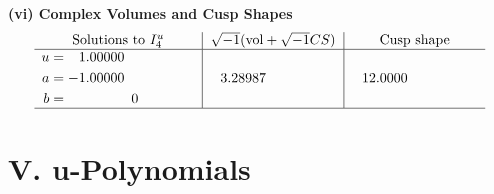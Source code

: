 \documentclass[1p]{elsarticle_modified}
\theoremstyle{definition}
\newcommand{\I}{\sqrt{-1}}
\begin{document}
\newpage\flushleft \textbf{(vi) Complex Volumes and Cusp Shapes}
$$\begin{array}{c|c|c}  
\text{Solutions to }I^u_{4}& \I (\text{vol} + \sqrt{-1}CS) & \text{Cusp shape}\\
 \hline 
\begin{aligned}
u &= \phantom{-}1.00000\phantom{ +0.000000I} \\
a &= -1.00000\phantom{ +0.000000I} \\
b &= \phantom{-0.000000 } 0\end{aligned}
 & \phantom{-}3.28987\phantom{ +0.000000I} & \phantom{-}12.0000\phantom{ +0.000000I}\\
 \hline 
 \end{array}$$\newpage
\newpage\renewcommand{\arraystretch}{1}
\centering \section*{ V. u-Polynomials}
\end{document}
